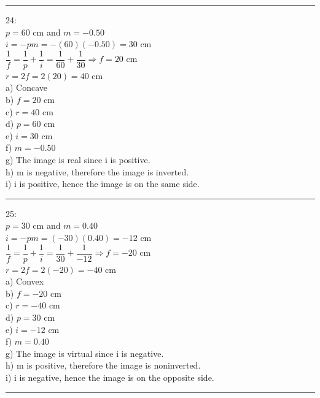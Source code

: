 \documentclass[fleqn]{article}
\begin{document}
\begin{enumerate}
    \textcolor{hwColor}{
      \rule{15cm}{0.4pt}
    }

    \textcolor{hwColor}{
      24: \\
      $p=60$ cm and $m=-0.50$ \\
      $i=-pm=-(60)(-0.50)=30$ cm \\
      $\dfrac{1}{f}=\dfrac{1}{p}+\dfrac{1}{i}=\dfrac{1}{60}+\dfrac{1}{30} \Longrightarrow f=20$ cm \\
      $r=2f=2(20)=40$ cm \\
      a) Concave \\
      b) $f=20$ cm \\
      c) $r=40$ cm \\
      d) $p=60$ cm \\
      e) $i=30$ cm \\
      f) $m=-0.50$ \\
      g) The image is real since i is positive. \\
      h) m is negative, therefore the image is inverted. \\
      i) i is positive, hence the image is on the same side. \\
    }

    \textcolor{hwColor}{
      \rule{15cm}{0.4pt}
    }

    \textcolor{hwColor}{
      25: \\
      $p=30$ cm and $m=0.40$ \\
      $i=-pm=(-30)(0.40)=-12$ cm \\
      $\dfrac{1}{f}=\dfrac{1}{p}+\dfrac{1}{i}=\dfrac{1}{30}+\dfrac{1}{-12} \Longrightarrow f=-20$ cm \\
      $r=2f=2(-20)=-40$ cm \\
      a) Convex \\
      b) $f=-20$ cm \\
      c) $r=-40$ cm \\
      d) $p=30$ cm \\
      e) $i=-12$ cm \\
      f) $m=0.40$ \\
      g) The image is virtual since i is negative. \\
      h) m is positive, therefore the image is noninverted. \\
      i) i is negative, hence the image is on the opposite side. \\
    }


    \textcolor{hwColor}{
      \rule{15cm}{0.4pt}
    }


\end{enumerate}
\end{document}

